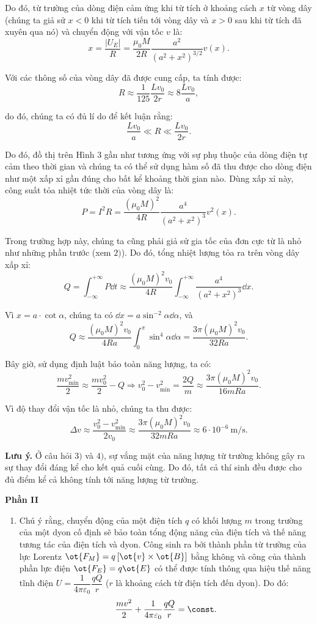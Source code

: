 \begin{loigiai}
\begin{enumerate}[1)]
Do đó, từ trường của dòng điện cảm ứng khi từ tích ở khoảng cách $x$ từ vòng dây (chúng ta giả sử $x<0$ khi từ tích tiến tới vòng dây và $x>0$ sau khi từ tích đã xuyên qua nó) và chuyển động với vận tốc $v$ là:
    \[ x =\dfrac{|U_E|}{R} = \dfrac{\mu_0 M}{2R} \dfrac{a^2}{(a^2 + x^2)^{3/2}}v(x).\]

Với các thông số của vòng dây đã được cung cấp, ta tính được:
   \[R \approx \dfrac{1}{125} \dfrac{Lv_0}{2r} \approx 8\dfrac{Lv_0}{a}, \]

do đó, chúng ta có đủ lí do để kết luận rằng:
   \[ \dfrac{Lv_0}{a} \ll R\ll\dfrac{Lv_0}{2r}.\]

Do đó, đồ thị trên Hình $3$ gần như tương ứng với sự phụ thuộc của dòng điện tự cảm theo thời gian và chúng ta có thể sử dụng hàm số đã thu được cho dòng điện như một xấp xỉ gần đúng cho bất kể khoảng thời gian nào. Dùng xấp xỉ này, công suất tỏa nhiệt tức thời của vòng dây là:
   \[P= I^2 R= \dfrac{(\mu_0 M)^2}{4R} \dfrac{a^4}{(a^2 + x^2)^3}v^2(x).\]

Trong trường hợp này, chúng ta cũng phải giả sử gia tốc của đơn cực từ là nhỏ như những phần trước (xem $2)$). Do đó, tổng nhiệt lượng tỏa ra trên vòng dây xấp xỉ:
    \[Q = \int_{- \infty}^{+\infty} P \dd t \approx \dfrac{(\mu_0 M)^2 v_0}{4R} \int_{- \infty}^{+\infty} \dfrac{a^4}{(a^2+x^2)^3}\dd x.\]

Vì $x = a \cdot \cot \alpha $, chúng ta có $\dd x = a \sin^{-2} \alpha \dd \alpha $, và
     \[ Q \approx \dfrac{(\mu_0 M)^2 v_0}{4Ra} \int_{0}^{\pi} \sin^4 \alpha \dd \alpha = \dfrac{3\pi (\mu_0 M)^2v_0}{32Ra} .\]

Bây giờ, sử dụng định luật bảo toàn năng lượng, ta có:
    \[ \dfrac{mv_{\min}^2 }{2} \approx \dfrac{mv_0^2}{2} - Q \Rightarrow v_0^2 - v_{\min}^2 = \dfrac{2Q}{m} \approx \dfrac{3\pi (\mu_0 M)^2 v_0}{16mRa}.\]

Vì độ thay đổi vận tốc là nhỏ, chúng ta thu được:
  \[\Delta v \approx \dfrac{v_0^2 - v_{\min}^2}{2v_0} \approx \dfrac{3\pi (\mu_0 M)^2 v_0}{32mRa} \approx 6 \cdot 10^{-6} ~\mathrm{m/s}.\]

\textbf{Lưu ý.} Ở câu hỏi $3)$ và $4)$, sự vắng mặt của năng lượng từ trường không gây ra sự thay đổi đáng kể cho kết quả cuối cùng. Do đó, tất cả thí sinh đều được cho đủ điểm kể cả không tính tới năng lượng từ trường.

\begin{center}
     \textbf{Phần II}
\end{center}
\begin{enumerate}[1)]
\item Chú ý rằng, chuyển động của một điện tích $q$ có khối lượng $m$ trong trường của một dyon cố định sẽ bảo toàn tổng động năng của điện tích và thế năng tương tác của điện tích và dyon. Công sinh ra bởi thành phần từ trường của lực Lorentz $\ot{F_M} = q \left[\ot{v}\times \ot{B} \right]$ bằng không và công của thành phần lực điện $\ot{F_E} = q\ot{E} $ có thể được tính thông qua hiệu thế năng tĩnh điện $U= \dfrac{1}{4\pi \varepsilon_0} \dfrac{qQ}{r}$ ($r$ là khoảng cách từ điện tích đến dyon). Do đó:
  \[\dfrac{mv^2}{2} + \dfrac{1}{4\pi \varepsilon_0}\dfrac{qQ}{r} = \const.\]


\end{enumerate}
\end{enumerate}
\end{loigiai}
